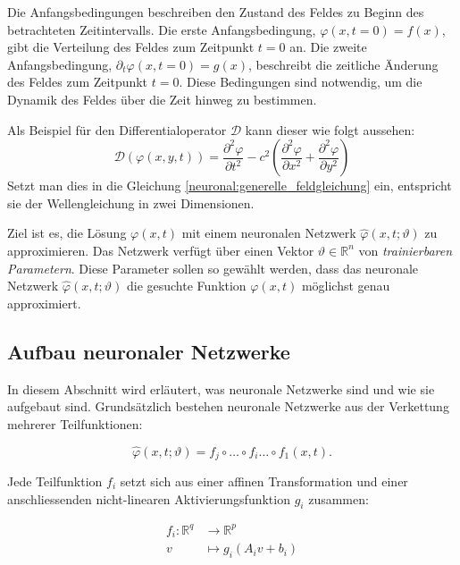 Die Anfangsbedingungen beschreiben den Zustand des Feldes zu Beginn des betrachteten Zeitintervalls.
Die erste Anfangsbedingung, $\varphi(x, t = 0) = f(x)$, gibt die Verteilung des Feldes zum Zeitpunkt $t = 0$ an.
Die zweite Anfangsbedingung, $\partial_t \varphi(x, t = 0) = g(x)$, beschreibt die zeitliche Änderung des Feldes zum Zeitpunkt $t = 0$.
Diese Bedingungen sind notwendig, um die Dynamik des Feldes über die Zeit hinweg zu bestimmen.

Als Beispiel für den Differentialoperator $\mathcal{D}$ kann dieser wie folgt aussehen:
\begin{equation*}
    \mathcal{D}(\varphi(x, y, t)) = \frac{\partial^2 \varphi}{\partial t^2} - c^2 \left( \frac{\partial^2 \varphi}{\partial x^2} + \frac{\partial^2 \varphi}{\partial y^2} \right)
\end{equation*}
Setzt man dies in die Gleichung \eqref{neuronal:generelle_feldgleichung} ein, entspricht sie der Wellengleichung in zwei Dimensionen.

Ziel ist es, die Lösung $\varphi(x, t)$ mit einem neuronalen Netzwerk $\hat{\varphi}(x, t; \vartheta)$ zu approximieren.
Das Netzwerk verfügt über einen Vektor \( \vartheta \in \mathbb{R}^n \) von \emph{trainierbaren Parametern}.
Diese Parameter sollen so gewählt werden, dass das neuronale Netzwerk $\hat{\varphi}(x, t; \vartheta)$ die gesuchte Funktion $\varphi(x, t)$ möglichst genau approximiert.

\subsection{Aufbau neuronaler Netzwerke}\label{neuronal:subsection:struktur_nn}
In diesem Abschnitt wird erläutert, was neuronale Netzwerke sind und wie sie aufgebaut sind.
Grundsätzlich bestehen neuronale Netzwerke aus der Verkettung mehrerer Teilfunktionen:

\begin{equation}
    \hat{\varphi}(x, t; \vartheta) = f_j \circ \ldots \circ f_i \ldots \circ f_1(x, t).
    \label{neuronal:nn_ausformuliert}
\end{equation}

Jede Teilfunktion \( f_i \) setzt sich aus einer affinen Transformation und einer anschliessenden nicht-linearen Aktivierungsfunktion \( g_i \) zusammen:

\begin{align*}
    f_i\colon \mathbb{R}^q & \longrightarrow \mathbb{R}^p \\
    v & \longmapsto g_i(A_i v + b_i)
\end{align*}

